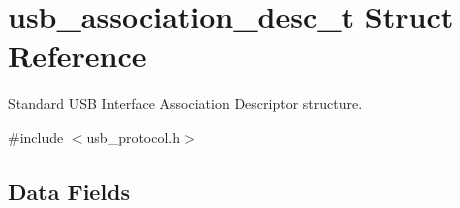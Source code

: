 \hypertarget{structusb__association__desc__t}{
\section{usb\-\_\-association\-\_\-desc\-\_\-t \-Struct \-Reference}
\label{structusb__association__desc__t}
}


\-Standard \-U\-S\-B \-Interface \-Association \-Descriptor structure.  




{\ttfamily \#include $<$usb\-\_\-protocol.\-h$>$}

\subsection*{\-Data \-Fields}
